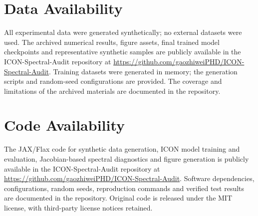 \section*{Data Availability}
\noindent
All experimental data were generated synthetically; no external datasets were used. The archived numerical results, figure assets, final trained model checkpoints and representative synthetic samples are publicly available in the ICON-Spectral-Audit repository at \url{https://github.com/gaozhiweiPHD/ICON-Spectral-Audit}. Training datasets were generated in memory; the generation scripts and random-seed configurations are provided. The coverage and limitations of the archived materials are documented in the repository.

\section*{Code Availability}
\noindent
The JAX/Flax code for synthetic data generation, ICON model training and evaluation, Jacobian-based spectral diagnostics and figure generation is publicly available in the ICON-Spectral-Audit repository at \url{https://github.com/gaozhiweiPHD/ICON-Spectral-Audit}. Software dependencies, configurations, random seeds, reproduction commands and verified test results are documented in the repository. Original code is released under the MIT license, with third-party license notices retained.
